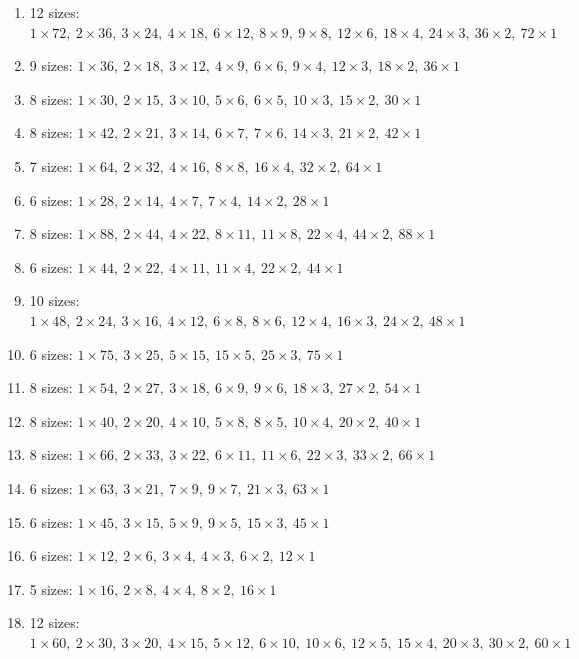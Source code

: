 \begin{enumerate}[label=\arabic*., leftmargin=*, itemsep=1pt]
\item 12 sizes: $1\times72,\ 2\times36,\ 3\times24,\ 4\times18,\ 6\times12,\ 8\times9,\ 9\times8,\ 12\times6,\ 18\times4,\ 24\times3,\ 36\times2,\ 72\times1$
\item 9 sizes: $1\times36,\ 2\times18,\ 3\times12,\ 4\times9,\ 6\times6,\ 9\times4,\ 12\times3,\ 18\times2,\ 36\times1$
\item 8 sizes: $1\times30,\ 2\times15,\ 3\times10,\ 5\times6,\ 6\times5,\ 10\times3,\ 15\times2,\ 30\times1$
\item 8 sizes: $1\times42,\ 2\times21,\ 3\times14,\ 6\times7,\ 7\times6,\ 14\times3,\ 21\times2,\ 42\times1$
\item 7 sizes: $1\times64,\ 2\times32,\ 4\times16,\ 8\times8,\ 16\times4,\ 32\times2,\ 64\times1$
\item 6 sizes: $1\times28,\ 2\times14,\ 4\times7,\ 7\times4,\ 14\times2,\ 28\times1$
\item 8 sizes: $1\times88,\ 2\times44,\ 4\times22,\ 8\times11,\ 11\times8,\ 22\times4,\ 44\times2,\ 88\times1$
\item 6 sizes: $1\times44,\ 2\times22,\ 4\times11,\ 11\times4,\ 22\times2,\ 44\times1$
\item 10 sizes: $1\times48,\ 2\times24,\ 3\times16,\ 4\times12,\ 6\times8,\ 8\times6,\ 12\times4,\ 16\times3,\ 24\times2,\ 48\times1$
\item 6 sizes: $1\times75,\ 3\times25,\ 5\times15,\ 15\times5,\ 25\times3,\ 75\times1$
\item 8 sizes: $1\times54,\ 2\times27,\ 3\times18,\ 6\times9,\ 9\times6,\ 18\times3,\ 27\times2,\ 54\times1$
\item 8 sizes: $1\times40,\ 2\times20,\ 4\times10,\ 5\times8,\ 8\times5,\ 10\times4,\ 20\times2,\ 40\times1$
\item 8 sizes: $1\times66,\ 2\times33,\ 3\times22,\ 6\times11,\ 11\times6,\ 22\times3,\ 33\times2,\ 66\times1$
\item 6 sizes: $1\times63,\ 3\times21,\ 7\times9,\ 9\times7,\ 21\times3,\ 63\times1$
\item 6 sizes: $1\times45,\ 3\times15,\ 5\times9,\ 9\times5,\ 15\times3,\ 45\times1$
\item 6 sizes: $1\times12,\ 2\times6,\ 3\times4,\ 4\times3,\ 6\times2,\ 12\times1$
\item 5 sizes: $1\times16,\ 2\times8,\ 4\times4,\ 8\times2,\ 16\times1$
\item 12 sizes: $1\times60,\ 2\times30,\ 3\times20,\ 4\times15,\ 5\times12,\ 6\times10,\ 10\times6,\ 12\times5,\ 15\times4,\ 20\times3,\ 30\times2,\ 60\times1$

\end{enumerate}
